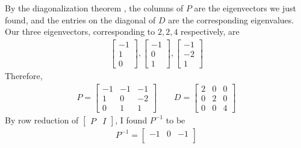 \documentclass[10pt,letterpaper,final]{report}
\begin{document}
\begin{enumerate}[label=(\alph*)]
        By the diagonalization theorem \cite[Theorem~5.3, p.~291]{LayEtAl2020LinearAlgebraAndItsApplications}, the columns of $P$ are the eigenvectors we just found, and the entries on the diagonal of $D$ are the corresponding eigenvalues. Our three eigenvectors, corresponding to $2, 2, 4$ respectively, are
        \begin{align*}
          \begin{bmatrix}
            -1 \\
            1  \\
            0
          \end{bmatrix}, \begin{bmatrix}
                           -1 \\
                           0  \\
                           1
                         \end{bmatrix}, \begin{bmatrix}
                                          -1 \\
                                          -2 \\
                                          1
                                        \end{bmatrix}
        \end{align*}
        Therefore,
        \begin{align*}
          P = \begin{bmatrix}
                -1 & -1 & -1 \\
                1  & 0  & -2 \\
                0  & 1  & 1
              \end{bmatrix} \qquad D = \begin{bmatrix}
                                         2 & 0 & 0 \\
                                         0 & 2 & 0 \\
                                         0 & 0 & 4
                                       \end{bmatrix}
        \end{align*}
        By row reduction of $\begin{bmatrix} P & I \end{bmatrix}$, I found $P^{-1}$ to be
        \begin{align*}
          P^{-1} = \begin{bmatrix}
                     -1           & 0            & -1           \\

\end{bmatrix}
\end{align*}
\end{enumerate}
\end{document}
